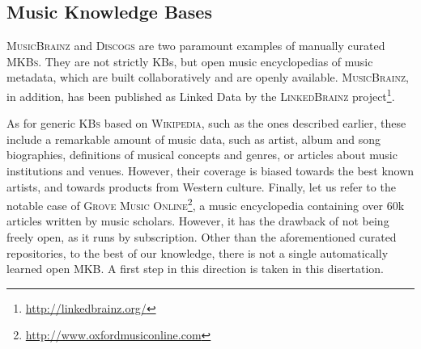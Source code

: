
\subsection{Music Knowledge Bases}\label{sec:SOA:nlu:mkbs}

\textsc{MusicBrainz} and \textsc{Discogs} are two paramount examples of manually curated \textsc{MKBs}. They are not strictly KBs, but open music encyclopedias of music metadata, which are built collaboratively and are openly available. \textsc{MusicBrainz}, in addition, has been published as Linked Data by the \textsc{LinkedBrainz} project\footnote{\url{http://linkedbrainz.org/}}.

As for generic \textsc{KBs} based on \textsc{Wikipedia}, such as the ones described earlier, these include a remarkable amount of music data, such as artist, album and song biographies, definitions of musical concepts and genres, or articles about music institutions and venues. However, their coverage is biased towards the best known artists, and towards products from Western culture. Finally, let us refer to the notable case of \textsc{Grove Music Online}\footnote{\url{http://www.oxfordmusiconline.com}}, a music encyclopedia containing over 60k articles written by music scholars. However, it has the drawback of not being freely open, as it runs by subscription.
Other than the aforementioned curated repositories, to the best of our knowledge, there is not a single automatically learned open \textsc{MKB}. A first step in this direction is taken in this disertation.

